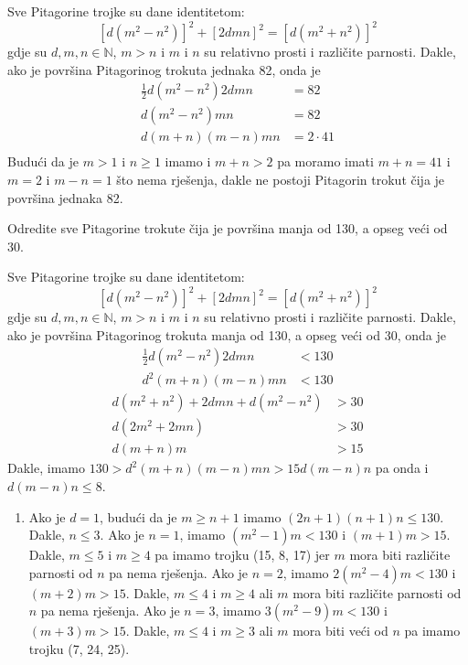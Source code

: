 \documentclass{exam}
\begin{document}
\begin{questions}
\begin{solution}
  Sve Pitagorine trojke su dane identitetom:
  \[
    [d(m^2-n^2)]^2 + [2dmn]^2 = [d(m^2+n^2)]^2
  \]
  gdje su $d, m, n \in \mathbb{N}$, $m > n$ i $m$ i $n$ su relativno prosti i različite parnosti. Dakle, ako je površina Pitagorinog trokuta jednaka 82, onda je
  \begin{align*}
    \frac{1}{2}d(m^2-n^2)2dmn &= 82\\
    d(m^2-n^2)mn &= 82\\
    d(m + n)(m - n)mn &= 2 \cdot 41\\
  \end{align*}
  Budući da je $m > 1$ i $n \geq 1$ imamo i $m + n > 2$ pa moramo imati $m + n = 41$ i $m = 2$ i $m - n = 1$ što nema rješenja, dakle ne postoji Pitagorin trokut čija je površina jednaka 82.
\end{solution}

\question Odredite sve Pitagorine trokute čija je površina manja od 130, a opseg veći od 30.

\begin{solution}
  Sve Pitagorine trojke su dane identitetom:
  \[
    [d(m^2-n^2)]^2 + [2dmn]^2 = [d(m^2+n^2)]^2
  \]
  gdje su $d, m, n \in \mathbb{N}$, $m > n$ i $m$ i $n$ su relativno prosti i različite parnosti. Dakle, ako je površina Pitagorinog trokuta manja od 130, a opseg veći od 30, onda je
  \begin{align*}
    \frac{1}{2}d(m^2-n^2)2dmn &< 130\\
    d^2(m+n)(m-n)mn &< 130
  \end{align*}
  \begin{align*}
    d(m^2+n^2) + 2dmn + d(m^2-n^2) &> 30\\
    d(2m^2+2mn) &> 30\\
    d(m + n)m &> 15
  \end{align*}
  Dakle, imamo $130 > d^2(m+n)(m-n)mn > 15d(m - n)n$ pa onda i $d(m - n)n \leq 8$.
  \begin{enumerate}
    \item Ako je $d = 1$, budući da je $m \geq n + 1$ imamo $(2n+1)(n+1)n \leq 130$. Dakle, $n \leq 3$. Ako je $n = 1$, imamo $(m^2 - 1)m < 130$ i $(m + 1)m > 15$. Dakle, $m \leq 5$ i $m \geq 4$ pa imamo trojku (15, 8, 17) jer $m$ mora biti različite parnosti od $n$ pa nema rješenja. Ako je $n = 2$, imamo $2(m^2 - 4)m < 130$ i $(m + 2)m > 15$. Dakle, $m \leq 4$ i $m \geq 4$ ali $m$ mora biti različite parnosti od $n$ pa nema rješenja. Ako je $n = 3$, imamo $3(m^2 - 9)m < 130$ i $(m + 3)m > 15$. Dakle, $m \leq 4$ i $m \geq 3$ ali $m$ mora biti veći od $n$ pa imamo trojku (7, 24, 25).


\end{enumerate}
\end{solution}
\end{questions}
\end{document}
